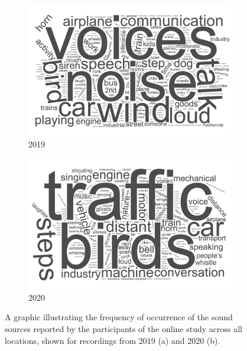    \begin{figure}[h]
    \begin{subfigure}[b]{0.45\textwidth}
      \centering
      \includegraphics[width=\textwidth]{Figures/Figure3a.jpg}
      \caption{2019 \label{fig:wordcloudA}}
    \end{subfigure}
    \hfill
    \begin{subfigure}[b]{0.45\textwidth}
      \centering
      \includegraphics[width=\textwidth]{Figures/Figure3b.jpg}
      \caption{2020 \label{fig:wordcloudB}}     
    \end{subfigure}
    \caption{A graphic illustrating the frequency of occurrence of the sound sources reported by the participants of the online study across all locations, shown for recordings from 2019 (a) and 2020 (b). \label{fig:wordclouds}}

    \end{figure}

